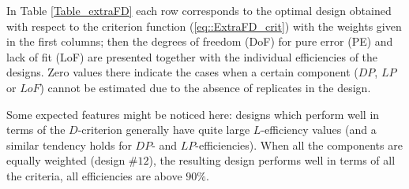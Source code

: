In Table \ref{Table_extraFD} each row corresponds to the optimal design obtained with respect to the criterion function (\ref{eq::ExtraFD_crit}) with the weights given in the first columns; then the degrees of freedom (DoF) for pure error (PE) and lack of fit (LoF) are presented together with the individual efficiencies of the designs. Zero values there indicate the cases when a certain component ($DP$, $LP$ or $LoF$) cannot be estimated due to the absence of replicates in the design. 

Some expected features might be noticed here: designs which perform well in terms of the $D$-criterion generally have quite large $L$-efficiency values (and a similar tendency holds for $DP$- and $LP$-efficiencies). When all the components are equally weighted (design \#$12$), the resulting design performs well in terms of all the criteria, all efficiencies are above $90\%$.  

